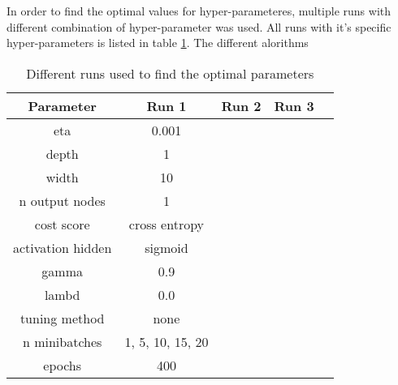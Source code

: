 In order to find the optimal values for hyper-parameteres, multiple runs with
different combination of hyper-parameter was used. All runs with it's specific
hyper-parameters is listed in table \ref{tab:runs_classification_cancer}. The different alorithms %


\begin{table}[H]
    \centering
    \caption{Different runs used to find the optimal parameters}  
    \label{tab:runs_classification_cancer} 
    \begin{tabular}{|c|c|c|c|c|}
        \hline

        Parameter & Run 1 & Run 2 & Run 3 \\
        \hline
        eta & 0.001 &  \\
        \hline
        depth & 1   \\
        \hline
        width & 10  \\
        \hline
        n output nodes & 1 \\
        \hline
        cost score & cross entropy \\
        \hline
        activation hidden & sigmoid \\
        \hline
        gamma & 0.9 \\
        \hline
        lambd & 0.0 \\
        \hline
        tuning method & none \\
        \hline
        n minibatches & 1, 5, 10, 15, 20 \\
        \hline
        epochs & 400  \\
        \hline
         
    \end{tabular} 
\end{table}






% 
